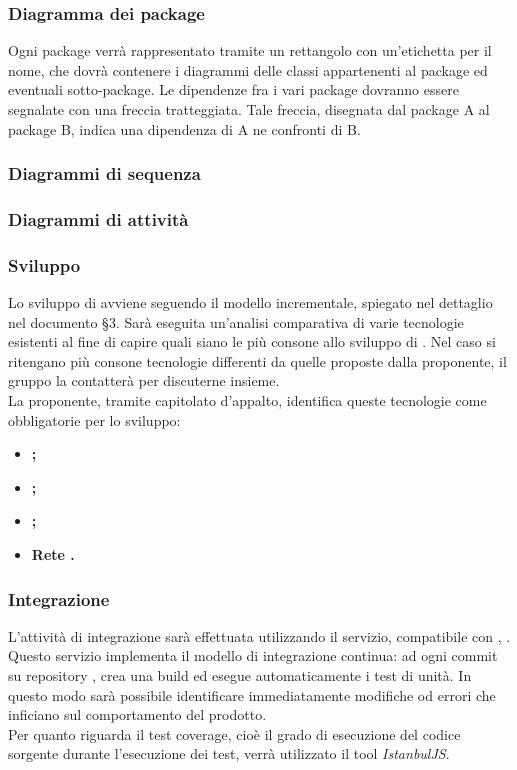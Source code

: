 \documentclass[NormeDiProgetto.tex]{subfiles}
\begin{document}
\subsubsection{Diagramma dei package}
Ogni package verrà rappresentato tramite un rettangolo con un'etichetta per il nome, che dovrà contenere i diagrammi delle classi appartenenti al package ed eventuali sotto-package. Le dipendenze fra i vari package dovranno essere segnalate con una freccia tratteggiata. Tale freccia, disegnata dal package A al package B, indica una dipendenza di A ne confronti di B.
\subsubsection{Diagrammi di sequenza}
\subsubsection{Diagrammi di attività}


\subsubsection{Sviluppo}
Lo sviluppo di \progetto avviene seguendo il modello incrementale, spiegato nel dettaglio nel documento \pdp \S 3. Sarà eseguita un'analisi comparativa di varie tecnologie esistenti al fine di capire quali siano le più consone allo sviluppo di \progetto. Nel caso si ritengano più consone tecnologie differenti da quelle proposte dalla proponente, il gruppo \gruppo la contatterà per discuterne insieme.\\
La proponente, tramite capitolato d'appalto, identifica queste tecnologie come obbligatorie per lo sviluppo:\\
\begin{itemize}
	\item \textbf{;}
	\item \textbf{;}
	\item \textbf{;}
	\item \textbf{Rete .}
\end{itemize}

\subsubsection{Integrazione}
L'attività di integrazione sarà effettuata utilizzando il servizio, compatibile con , \textit{}.\\
Questo servizio implementa il modello di integrazione continua: ad ogni commit su repository ,  crea una build ed esegue automaticamente i test di unità. In questo modo sarà possibile identificare immediatamente modifiche od errori che inficiano sul comportamento del prodotto.\\
Per quanto riguarda il test coverage, cioè il grado di esecuzione del codice sorgente durante l'esecuzione dei test, verrà utilizzato il tool  \textit{IstanbulJS}. 
\end{document}
